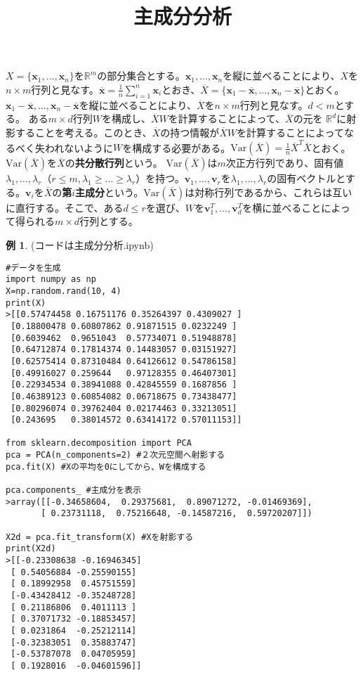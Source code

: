\documentclass{jsarticle}
\theoremstyle{definition}
\newtheorem{ex}{例}[section]
\begin{document}
\title{主成分分析}
\date{}
\maketitle
$X=\{\mathbf{x}_{1},\dots,\mathbf{x}_{n}\}$を$\mathbb{R}^{m}$の部分集合とする。$\mathbf{x}_{1},\dots,\mathbf{x}_{n}$を縦に並べることにより、$X$を$n\times m$行列と見なす。$\overline{\mathbf{x}}=\frac{1}{n}\sum_{i=1}^{n}\mathbf{x}_{i}$とおき、$\overline{X}=\{\mathbf{x}_{1}-\overline{\mathbf{x}},\dots,\mathbf{x}_{n}-\overline{\mathbf{x}}\}$とおく。$\mathbf{x}_{1}-\overline{\mathbf{x}},\dots,\mathbf{x}_{n}-\overline{\mathbf{x}}$を縦に並べることにより、$\overline{X}$を$n\times m$行列と見なす。$d<m$とする。
ある$m\times d$行列$W$を構成し、$\overline{X}W$を計算することによって、$\overline{X}$の元を
$\mathbb{R}^{d}$に射影することを考える。このとき、$\overline{X}$の持つ情報が$\overline{X}W$を計算することによってなるべく失われないように$W$を構成する必要がある。$\mathrm{Var}(\overline{X})=\frac{1}{n}\overline{X}^{T}\overline{X}$とおく。$\mathrm{Var}(\overline{X})$を$\overline{X}$の\textbf{共分散行列}という。
$\mathrm{Var}(\overline{X})$は$m$次正方行列であり、固有値$\lambda_{1},\dots,\lambda_{r}$（$r\leq m,\lambda_{1}\geq\dots\geq \lambda_{r}$）を持つ。$\mathbf{v}_{1},\dots,\mathbf{v}_{r}$を$\lambda_{1},\dots,\lambda_{r}$の固有ベクトルとする。$\mathbf{v}_{i}$を$\overline{X}$の\textbf{第$i$主成分}という。$\mathrm{Var}(\overline{X})$は対称行列であるから、これらは互いに直行する。そこで、ある$d\leq r$を選び、$W$を$\mathbf{v}_{1}^{T},\dots,\mathbf{v}_{d}^{T}$を横に並べることによって得られる$m\times d$行列とする。
\begin{ex} (コードは主成分分析.ipynb) 
\begin{verbatim}
#データを生成
import numpy as np
X=np.random.rand(10, 4)
print(X)
>[[0.57474458 0.16751176 0.35264397 0.4309027 ]
 [0.18800478 0.60807862 0.91871515 0.0232249 ]
 [0.6039462  0.9651043  0.57734071 0.51948878]
 [0.64712874 0.17814374 0.14483057 0.03151927]
 [0.62575414 0.87310484 0.64126612 0.54786158]
 [0.49916027 0.259644   0.97128355 0.46407301]
 [0.22934534 0.38941088 0.42845559 0.1687856 ]
 [0.46389123 0.60854082 0.06718675 0.73438477]
 [0.80296074 0.39762404 0.02174463 0.33213051]
 [0.243695   0.38014572 0.63414172 0.57011153]]
 
from sklearn.decomposition import PCA
pca = PCA(n_components=2) #２次元空間へ射影する
pca.fit(X) #Xの平均を0にしてから、Wを構成する

pca.components_ #主成分を表示
>array([[-0.34658604,  0.29375681,  0.89071272, -0.01469369],
       [ 0.23731118,  0.75216648, -0.14587216,  0.59720207]])

X2d = pca.fit_transform(X) #Xを射影する
print(X2d)
>[[-0.23308638 -0.16946345]
 [ 0.54056884 -0.25590155]
 [ 0.18992958  0.45751559]
 [-0.43428412 -0.35248728]
 [ 0.21186806  0.4011113 ]
 [ 0.37071732 -0.18853457]
 [ 0.0231864  -0.25212114]
 [-0.32383051  0.35883747]
 [-0.53787078  0.04705959]
 [ 0.1928016  -0.04601596]]       
\end{verbatim}
\end{ex}
\end{document}
